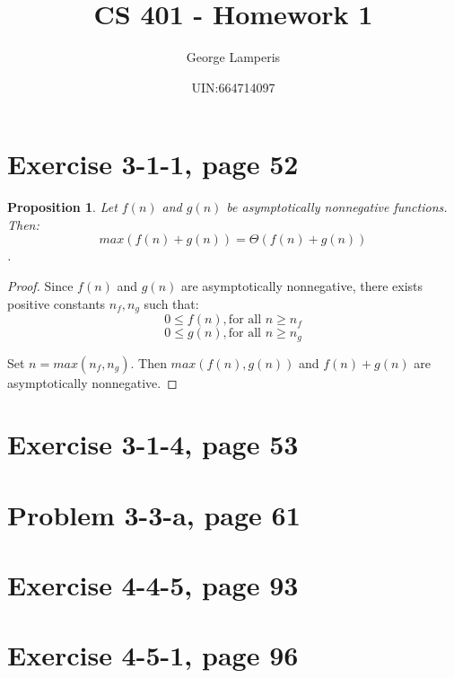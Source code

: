 \documentclass[letterpaper, 11pt]{article}
\title{CS 401 - Homework 1}
\author{George Lamperis}
\date{UIN:664714097}
\theoremstyle{mystyle}
\newtheorem*{prop}{Proposition}
\begin{document}
\maketitle


\section{Exercise 3-1-1, page 52}

\begin{prop}
    Let $f(n)$ and $g(n)$ be asymptotically nonnegative functions. Then:
    \[max(f(n) + g(n)) = \Theta (f(n) + g(n))\].
\end{prop}

\begin{proof}
    Since $f(n)$ and $g(n)$ are asymptotically nonnegative, there exists positive
    constants $n_f, n_g$ such that:
    \[ 0 \leq f(n), \text{for all } n \geq n_f \]
    \[ 0 \leq g(n), \text{for all } n \geq n_g \]

    Set $n = max(n_f, n_g)$. Then $max(f(n), g(n))$ and $f(n) + g(n)$ are asymptotically
    nonnegative.
\end{proof}

\section{Exercise 3-1-4, page 53}

\section{Problem 3-3-a, page 61}


\section{Exercise 4-4-5, page 93}

\section{Exercise 4-5-1, page 96}
\end{document}
